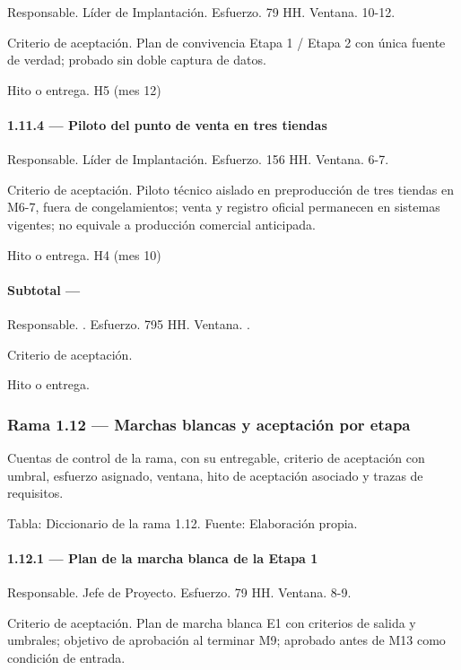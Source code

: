 \documentclass[11pt]{article}
\begin{document}
Responsable. Líder de Implantación. Esfuerzo. 79 HH. Ventana. 10-12.

Criterio de aceptación. Plan de convivencia Etapa 1 / Etapa 2 con única fuente de verdad; probado sin doble captura de datos.

Hito o entrega. H5 (mes 12)

\paragraph{1.11.4 — Piloto del punto de venta en tres tiendas}

Responsable. Líder de Implantación. Esfuerzo. 156 HH. Ventana. 6-7.

Criterio de aceptación. Piloto técnico aislado en preproducción de tres tiendas en M6-7, fuera de congelamientos; venta y registro oficial permanecen en sistemas vigentes; no equivale a producción comercial anticipada.

Hito o entrega. H4 (mes 10)

\paragraph{Subtotal — }

Responsable. . Esfuerzo. 795 HH. Ventana. .

Criterio de aceptación.

Hito o entrega.

\subsubsection{Rama 1.12 — Marchas blancas y aceptación por etapa}

Cuentas de control de la rama, con su entregable, criterio de aceptación con umbral, esfuerzo asignado, ventana, hito de aceptación asociado y trazas de requisitos.

Tabla: Diccionario de la rama 1.12. Fuente: Elaboración propia.

\paragraph{1.12.1 — Plan de la marcha blanca de la Etapa 1}

Responsable. Jefe de Proyecto. Esfuerzo. 79 HH. Ventana. 8-9.

Criterio de aceptación. Plan de marcha blanca E1 con criterios de salida y umbrales; objetivo de aprobación al terminar M9; aprobado antes de M13 como condición de entrada.
\end{document}
